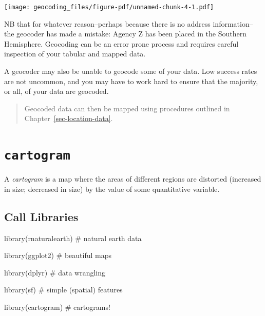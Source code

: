 \documentclass[
  letterpaper,
  DIV=11,
  numbers=noendperiod,
  oneside]{scrreprt}
\newenvironment{Shaded}{\begin{snugshade}}{\end{snugshade}}
\newcommand{\CommentTok}[1]{\textcolor[rgb]{0.37,0.37,0.37}{#1}}
\newcommand{\FunctionTok}[1]{\textcolor[rgb]{0.28,0.35,0.67}{#1}}
\newcommand{\NormalTok}[1]{\textcolor[rgb]{0.00,0.23,0.31}{#1}}
\begin{document}
\texttt{[image: geocoding\_files/figure-pdf/unnamed-chunk-4-1.pdf]}

\begin{tcolorbox}[enhanced jigsaw, opacityback=0, colback=white, toprule=.15mm, colframe=quarto-callout-important-color-frame, bottomrule=.15mm, title=\textcolor{quarto-callout-important-color}{\faExclamation}\hspace{0.5em}{Geocoding Can Make Errors!}, coltitle=black, toptitle=1mm, bottomtitle=1mm, arc=.35mm, breakable, colbacktitle=quarto-callout-important-color!10!white, left=2mm, rightrule=.15mm, titlerule=0mm, leftrule=.75mm, opacitybacktitle=0.6]

NB that for whatever reason--perhaps because there is no address
information--the geocoder has made a mistake: Agency Z has been placed
in the Southern Hemisphere. Geocoding can be an error prone process and
requires careful inspection of your tabular and mapped data.

A geocoder may also be unable to geocode some of your data. Low success
rates are not uncommon, and you may have to work hard to ensure that the
majority, or all, of your data are geocoded.

\end{tcolorbox}

\begin{quote}
Geocoded data can then be mapped using procedures outlined in
Chapter~\ref{sec-location-data}.
\end{quote}

\chapter{\texorpdfstring{\texttt{cartogram}}{cartogram}}\label{cartogram}

A \emph{cartogram} is a map where the areas of different regions are
distorted (increased in size; decreased in size) by the value of some
quantitative variable.

\section{Call Libraries}\label{call-libraries-7}

\begin{Shaded}
\begin{Highlighting}[]
\FunctionTok{library}\NormalTok{(rnaturalearth) }\CommentTok{\# natural earth data}

\FunctionTok{library}\NormalTok{(ggplot2) }\CommentTok{\# beautiful maps}

\FunctionTok{library}\NormalTok{(dplyr) }\CommentTok{\# data wrangling}

\FunctionTok{library}\NormalTok{(sf) }\CommentTok{\# simple (spatial) features}

\FunctionTok{library}\NormalTok{(cartogram) }\CommentTok{\# cartograms!}
\end{Highlighting}
\end{Shaded}
\end{document}
